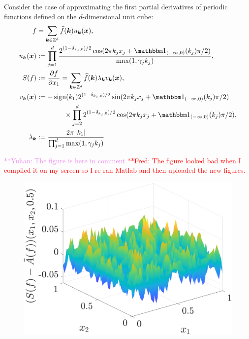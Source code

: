 \documentclass[final]{elsarticle}
\newcommand{\pin}{p_{\text{\rm{in}}}}
\newcommand{\pout}{p_{\text{\rm{out}}}}
\theoremstyle{definition}
\theoremstyle{remark}
\newcommand{\frednote}[1]{  {\textcolor{red}  {\mbox{**Fred:} #1}}}
\newcommand{\yuhannote}[1]{ {\textcolor{violet}  {\mbox{**Yuhan:} #1}}}
\begin{document}
Consider the case of approximating the first partial derivatives of periodic functions defined on the $d$-dimensional unit cube:
\begin{align*}
f &= \sum_{\vk \in \integers^d} \hf(\vk) u_{\vk} (\vx), \\
u_{\vk} (\vx) &:= \prod_{j=1}^d \frac{2^{(1-\delta_{k_j,0})/2}\cos(2\pi k_j x_j  + \bbone_{(-\infty,0)}(k_j) \pi/2 )}{\max(1,\gamma_j k_j)},  \\
S(f) &: = \frac{\partial f}{\partial x_1} = \sum_{\vk \in \integers^d} \hf(\vk) \lambda_{\vk} v_{\vk} (\vx), \\
v_{\vk}(\vx) & : =  -\sign(k_1) 2^{(1-\delta_{k_1,0})/2} \sin(2\pi k_j x_j  + \bbone_{(-\infty,0)}(k_j) \pi/2 ) \\
& \qquad \qquad \times \prod_{j=2}^d 2^{(1-\delta_{k_j,0})/2} \cos(2\pi k_j x_j  + \bbone_{(-\infty,0)}(k_j) \pi/2 ), \\
\lambda_{\vk} &:= \frac{2 \pi \abs{k_1}}{\prod_{j=1}^d\max(1,\gamma_j k_j)}
\end{align*}

\yuhannote{The figure is here in comment} \frednote{The figure looked bad when I compiled it on my screen so I re-ran Matlab and then uploaded the new figures.}
\begin{figure}
	\centering
	\includegraphics[width = 8 cm]{ProgramsImages/SimDirectSolErr.eps}
\end{figure}


%
%
\end{document}
